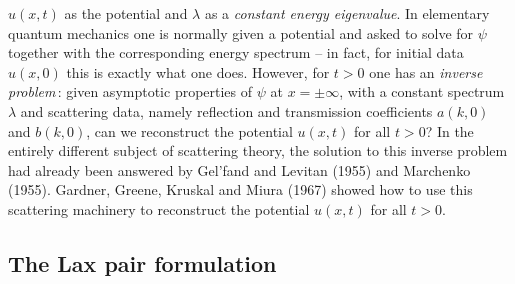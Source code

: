 \documentclass[11pt]{article}
\begin{document}
$u(x,t)$ as the potential and $\lambda$ as a \textit{constant energy eigenvalue}. In elementary quantum mechanics one is normally given a potential and asked to solve for $\psi$ together with the corresponding energy spectrum -- in fact, for 
initial data $u(x,0)$ this is exactly what one does. However, for $t > 0$ one has an \textit{inverse problem}\,: given 
asymptotic properties of $\psi$ at $x = \pm \infty$, with a constant spectrum $\lambda$ and scattering data, namely 
reflection and transmission coefficients $a(k,0)$ and $b(k,0)$, can we reconstruct the potential $u(x,t)$ for all $t > 0$? 
In the entirely different subject of scattering theory, the solution to this inverse problem had already been answered by Gel'fand and Levitan (1955) and Marchenko (1955). Gardner, Greene, Kruskal and Miura (1967) showed how to use this scattering machinery to reconstruct the potential $u(x,t)$ for all $t > 0$. 

\subsection{\small The Lax pair formulation}\label{sect:Lax}
\end{document}
